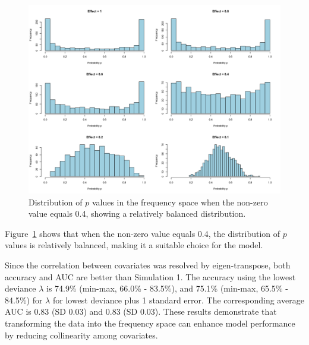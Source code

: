 \documentclass[12pt]{article}
\begin{document}
\begin{figure}[H]
  \centering
  \includegraphics[width=\textwidth]{../Figures/sim2_p_dist.png}
  \caption{Distribution of \(p\) values in the frequency space when the non-zero value equals 0.4, showing a relatively balanced distribution.}
  \label{fig:sim2_p_dist}
\end{figure}

Figure~\ref{fig:sim2_p_dist} shows that when the non-zero value equals 0.4, the distribution of \(p\) values is relatively balanced, making it a suitable choice for the model.

Since the correlation between covariates was resolved by eigen-transpose, both accuracy and AUC are better than Simulation 1. The accuracy using the lowest deviance \(\lambda\) is 74.9\% (min-max, 66.0\% - 83.5\%), and 75.1\% (min-max, 65.5\% - 84.5\%) for \(\lambda\) for lowest deviance plus 1 standard error. The corresponding average AUC is 0.83 (SD 0.03) and 0.83 (SD 0.03). These results demonstrate that transforming the data into the frequency space can enhance model performance by reducing collinearity among covariates.
\end{document}
